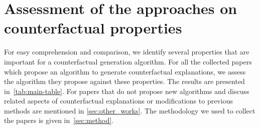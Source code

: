 \section{Assessment of the approaches on counterfactual properties}
\label{sec:table}

For easy comprehension and comparison, we identify several properties that are important for a counterfactual generation algorithm. 
For all the collected papers which propose an algorithm to generate counterfactual explanations, we assess the algorithm they propose against these properties. 
The results are presented in~\cref{tab:main-table}. 
For papers that do not propose new algorithms and discuss related aspects of counterfactual explanations or modifications to previous methods are mentioned in \cref{sec:other_works}. 
The methodology we used to collect the papers is given in~\cref{sec:method}. 


